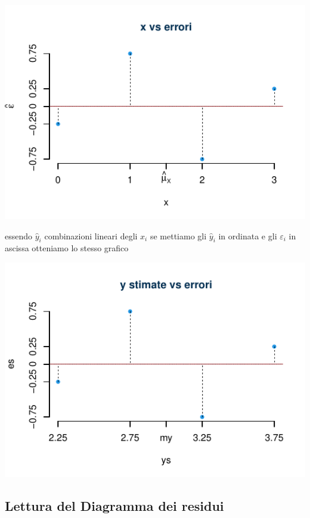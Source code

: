 \documentclass[
  11pt,
]{book}
\theoremstyle{mytheoremstyle}
\theoremstyle{mydefstyle}
\begin{document}
\begin{center}\includegraphics{Appunti_di_Statistica_2025_files/figure-latex/18-regressione-II-11-1} \end{center}

essendo \(\hat y_i\) combinazioni lineari degli \(x_i\) se mettiamo gli \(\hat y_i\) in ordinata
e gli \(\varepsilon_i\) in ascissa otteniamo lo stesso grafico

\begin{center}\includegraphics{Appunti_di_Statistica_2025_files/figure-latex/18-regressione-II-12-1} \end{center}

\subsection{Lettura del Diagramma dei residui}\label{lettura-del-diagramma-dei-residui}
\end{document}
